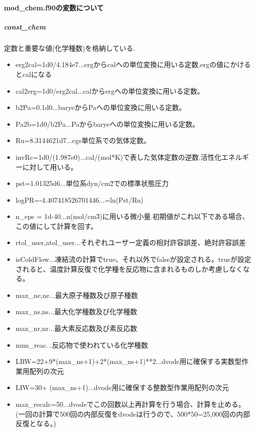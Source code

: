 \documentclass{jsarticle}
\begin{document}
\paragraph{mod\_chem.f90の変数について}%
\subparagraph{const\_chem}定数と重要な値(化学種数)を格納している.
\begin{itemize}
\item erg2cal=1d0/4.184e7...ergからcalへの単位変換に用いる定数.ergの値にかけるとcalになる
\item cal2erg=1d0/erg2cal...calからergへの単位変換に用いる定数。
\item b2Pa=0.1d0...baryeからPaへの単位変換に用いる定数。
\item Pa2b=1d0/b2Pa...Paからbaryeへの単位変換に用いる定数。
\item Ru=8.3144621d7...cgs単位系での気体定数。
\item invRc=1d0/(1.987e0)...cal/(mol*K)で表した気体定数の逆数.活性化エネルギーに対して用いる。
\item pst=1.01325d6...単位系dyn/cm\^2での標準状態圧力
\item logPR=-4.407418526701446...=ln(Pst/Ru)
\item n\_eps = 1d-40...n(mol/cm\^3)に用いる微小量.初期値がこれ以下である場合、この値にして計算を回す。
\item rtol\_user,atol\_user...それぞれユーザー定義の相対許容誤差、絶対許容誤差
\item isColdFlow...凍結流の計算でtrue、それ以外でfalseが設定される。trueが設定されると、温度計算反復で化学種を反応物に含まれるものしか考慮しなくなる。
\item max\_ne,ne...最大原子種数及び原子種数
\item max\_ns,ns...最大化学種数及び化学種数
\item max\_nr,nr...最大素反応数及び素反応数
\item num\_reac...反応物で使われている化学種数
\item LRW=22+9*(max\_ns+1)+2*(max\_ns+1)**2...dvode用に確保する実数型作業用配列の次元
\item LIW=30+  (max\_ns+1)...dvode用に確保する整数型作業用配列の次元
\item max\_recalc=50...dvodeでこの回数以上再計算を行う場合、計算を止める。(一回の計算で500回の内部反復をdvodeは行うので、500*50=25,000回の内部反復となる。)
\end{itemize}
\end{document}
